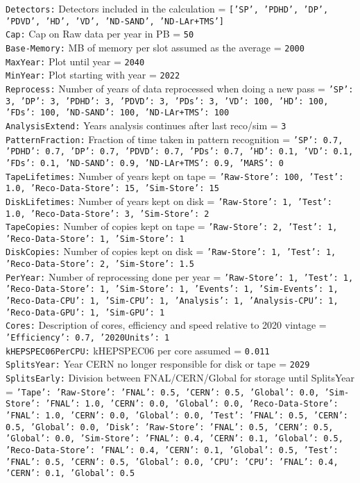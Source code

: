 {\tt Detectors:} Detectors included in the calculation = {\tt ['SP', 'PDHD', 'DP', 'PDVD', 'HD', 'VD', 'ND-SAND', 'ND-LAr+TMS']} \\
{\tt Cap:} Cap on Raw data per year in PB = {\tt 50} \\
{\tt Base-Memory:} MB of memory per slot assumed as the average = {\tt 2000} \\
{\tt MaxYear:} Plot until year = {\tt 2040} \\
{\tt MinYear:} Plot starting with year = {\tt 2022} \\
{\tt Reprocess:} Number of years of data reprocessed when doing a new pass = {\tt {'SP': 3, 'DP': 3, 'PDHD': 3, 'PDVD': 3, 'PDs': 3, 'VD': 100, 'HD': 100, 'FDs': 100, 'ND-SAND': 100, 'ND-LAr+TMS': 100}} \\
{\tt AnalysisExtend:} Years analysis continues after last reco/sim = {\tt 3} \\
{\tt PatternFraction:} Fraction of time taken in pattern recognition = {\tt {'SP': 0.7, 'PDHD': 0.7, 'DP': 0.7, 'PDVD': 0.7, 'PDs': 0.7, 'HD': 0.1, 'VD': 0.1, 'FDs': 0.1, 'ND-SAND': 0.9, 'ND-LAr+TMS': 0.9, 'MARS': 0}} \\
{\tt TapeLifetimes:} Number of years kept on tape = {\tt {'Raw-Store': 100, 'Test': 1.0, 'Reco-Data-Store': 15, 'Sim-Store': 15}} \\
{\tt DiskLifetimes:} Number of years kept on disk = {\tt {'Raw-Store': 1, 'Test': 1.0, 'Reco-Data-Store': 3, 'Sim-Store': 2}} \\
{\tt TapeCopies:} Number of copies kept on tape = {\tt {'Raw-Store': 2, 'Test': 1, 'Reco-Data-Store': 1, 'Sim-Store': 1}} \\
{\tt DiskCopies:} Number of copies kept on disk = {\tt {'Raw-Store': 1, 'Test': 1, 'Reco-Data-Store': 2, 'Sim-Store': 1.5}} \\
{\tt PerYear:} Number of reprocessing done per year = {\tt {'Raw-Store': 1, 'Test': 1, 'Reco-Data-Store': 1, 'Sim-Store': 1, 'Events': 1, 'Sim-Events': 1, 'Reco-Data-CPU': 1, 'Sim-CPU': 1, 'Analysis': 1, 'Analysis-CPU': 1, 'Reco-Data-GPU': 1, 'Sim-GPU': 1}} \\
{\tt Cores:} Description of cores, efficiency and speed relative to 2020 vintage = {\tt {'Efficiency': 0.7, '2020Units': 1}} \\
{\tt kHEPSPEC06PerCPU:} kHEPSPEC06 per core assumed = {\tt 0.011} \\
{\tt SplitsYear:} Year CERN no longer responsible for disk or tape = {\tt 2029} \\
{\tt SplitsEarly:} Division between FNAL/CERN/Global for storage until SplitsYear = {\tt {'Tape': {'Raw-Store': {'FNAL': 0.5, 'CERN': 0.5, 'Global': 0.0}, 'Sim-Store': {'FNAL': 1.0, 'CERN': 0.0, 'Global': 0.0}, 'Reco-Data-Store': {'FNAL': 1.0, 'CERN': 0.0, 'Global': 0.0}, 'Test': {'FNAL': 0.5, 'CERN': 0.5, 'Global': 0.0}}, 'Disk': {'Raw-Store': {'FNAL': 0.5, 'CERN': 0.5, 'Global': 0.0}, 'Sim-Store': {'FNAL': 0.4, 'CERN': 0.1, 'Global': 0.5}, 'Reco-Data-Store': {'FNAL': 0.4, 'CERN': 0.1, 'Global': 0.5}, 'Test': {'FNAL': 0.5, 'CERN': 0.5, 'Global': 0.0}}, 'CPU': {'CPU': {'FNAL': 0.4, 'CERN': 0.1, 'Global': 0.5}}}} \\
